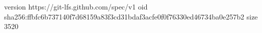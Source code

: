 version https://git-lfs.github.com/spec/v1
oid sha256:ffbfc6b737140f7d68159a83f3cd31bdaf3acfe0f0f76330ed46734ba0e257b2
size 3520
